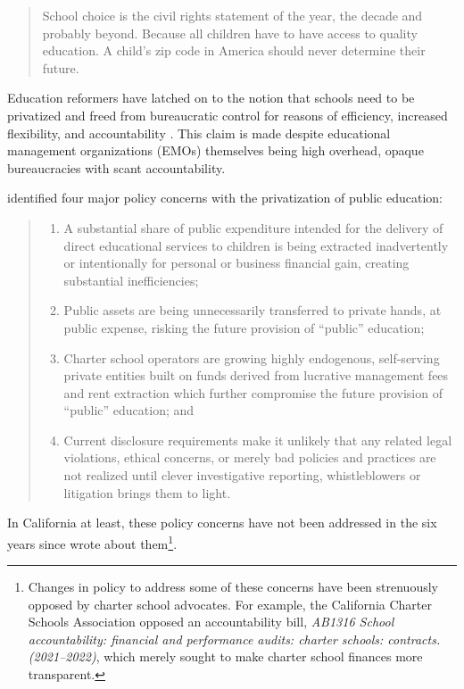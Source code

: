 \begin{quote}\OnehalfSpacing%
School choice is the civil rights statement of the year, the decade and probably beyond. Because all children have to have access to quality education. A child’s zip code in America should never determine their future.\\      
\end{quote} 

Education reformers have latched on to the notion that schools need to be privatized and freed from bureaucratic control for reasons of efficiency, increased flexibility, and accountability \parencite{Garcia2018}%
. This claim is made despite educational management organizations (EMOs) themselves being high overhead, opaque bureaucracies with scant accountability.

\citeauthor{Baker.Miron2015} identified four major policy concerns with the privatization of public education:

\begin{quote}\OnehalfSpacing%
  \begin{enumerate}
    \item A substantial share of public expenditure intended for the delivery of direct educational services to children is being extracted inadvertently or intentionally for personal or business financial gain, creating substantial inefficiencies;
    \item Public assets are being unnecessarily transferred to private hands, at public expense, risking the future provision of “public” education;
    \item Charter school operators are growing highly endogenous, self-serving private entities built on funds derived from lucrative management fees and rent extraction which further compromise the future provision of “public” education; and
    \item Current disclosure requirements make it unlikely that any related legal violations, ethical concerns, or merely bad policies and practices are not realized until clever investigative reporting, whistleblowers or litigation brings them to light.
  \end{enumerate} 
\end{quote}

In California at least, these policy concerns have not been addressed in the six years since \citeauthor{Baker.Miron2015} wrote about them\footnote{Changes in policy to address some of these concerns have been strenuously opposed by charter school advocates. For example, the California Charter Schools Association opposed an accountability bill, \textit{AB1316 School accountability: financial and performance audits: charter schools: contracts. (2021–2022)}, which merely sought to make charter school finances more transparent.}.

